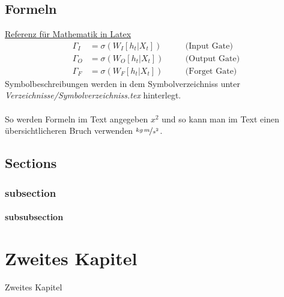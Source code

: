 \section{Formeln}
\label{sec:Formeln}
%
\href{https://en.wikibooks.org/wiki/LaTeX/Mathematics}{Referenz für Mathematik in Latex}
%
\begin{align}
	\label{eq:input_gate}
	\Gamma_I &= \sigma\left(W_{I}\left[h_t|X_t\right]\right)&&\quad\text{(Input Gate)}\\
	\label{eq:output_gate}
	\Gamma_O &= \sigma\left(W_{O}\left[h_t|X_t\right]\right)&&\quad\text{(Output Gate)}\\
	\label{eq:forget_gate}
	\Gamma_F &= \sigma\left(W_{F}\left[h_t|X_t\right]\right)&&\quad\text{(Forget Gate)}
\end{align}
%
Symbolbeschreibungen werden in dem Symbolverzeichniss unter \textit{Verzeichnisse/Symbolverzeichniss.tex} hinterlegt.\\\\
%
So werden Formeln im Text angegeben $x^2$ und so kann man im Text einen übersichtlicheren Bruch verwenden $\nicefrac{kg\,m}{s^2}$.
%
%
\section{Sections}
\label{sec:sections}
%
\subsection{subsection}
\label{subsec:subsection}
%
\subsubsection{subsubsection}
\label{subsubsec:subsubsection}
%
%
\chapter{Zweites Kapitel}
\label{chap:Zweites Kapitel}
%
Zweites Kapitel
%
%